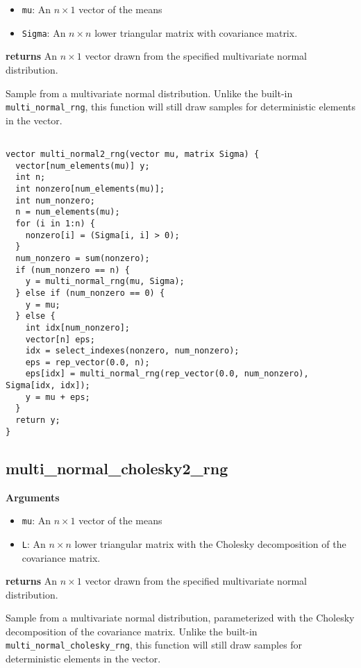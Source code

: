 \documentclass[]{book}
\providecommand{\tightlist}{%
  \setlength{\itemsep}{0pt}\setlength{\parskip}{0pt}}
\begin{document}
\begin{itemize}
\tightlist
\item
  \texttt{mu}: An \(n \times 1\) vector of the means
\item
  \texttt{Sigma}: An \(n \times n\) lower triangular matrix with
  covariance matrix.
\end{itemize}

\textbf{returns} An \(n \times 1\) vector drawn from the specified
multivariate normal distribution.

Sample from a multivariate normal distribution. Unlike the built-in
\texttt{multi\_normal\_rng}, this function will still draw samples for
deterministic elements in the vector.

\begin{verbatim}

vector multi_normal2_rng(vector mu, matrix Sigma) {
  vector[num_elements(mu)] y;
  int n;
  int nonzero[num_elements(mu)];
  int num_nonzero;
  n = num_elements(mu);
  for (i in 1:n) {
    nonzero[i] = (Sigma[i, i] > 0);
  }
  num_nonzero = sum(nonzero);
  if (num_nonzero == n) {
    y = multi_normal_rng(mu, Sigma);
  } else if (num_nonzero == 0) {
    y = mu;
  } else {
    int idx[num_nonzero];
    vector[n] eps;
    idx = select_indexes(nonzero, num_nonzero);
    eps = rep_vector(0.0, n);
    eps[idx] = multi_normal_rng(rep_vector(0.0, num_nonzero), Sigma[idx, idx]);
    y = mu + eps;
  }
  return y;
}

\end{verbatim}

\subsection{multi\_normal\_cholesky2\_rng}\label{multi_normal_cholesky2_rng}

\textbf{Arguments}

\begin{itemize}
\tightlist
\item
  \texttt{mu}: An \(n \times 1\) vector of the means
\item
  \texttt{L}: An \(n \times n\) lower triangular matrix with the
  Cholesky decomposition of the covariance matrix.
\end{itemize}

\textbf{returns} An \(n \times 1\) vector drawn from the specified
multivariate normal distribution.

Sample from a multivariate normal distribution, parameterized with the
Cholesky decomposition of the covariance matrix. Unlike the built-in
\texttt{multi\_normal\_cholesky\_rng}, this function will still draw
samples for deterministic elements in the vector.
\end{document}
